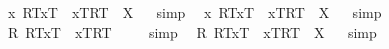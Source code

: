 \begin{isabellebody}
%
\endisatagproof
{\isafoldproof}%
%
\isadelimproof
%
\endisadelimproof
\isanewline
{}\isamarkupfalse%
\ {\isachardoublequoteopen}{\isacharbrackleft}{\isacharparenleft}\isactrlbold {\isasymforall}x{\isachardot}\ {\isasymlparr}R\isactrlsup T{\isacharcomma}x\isactrlsup T{\isasymrparr}\ \isactrlbold {\isasymrightarrow}\ {\isasymlbrace}x\isactrlsup T{\isacharcomma}R\isactrlsup T{\isasymrbrace}{\isacharparenright}{\isacharbrackright}\ {\isacharequal}\ X{\isachardoublequoteclose}%
\isadelimproof
\ %
\endisadelimproof
%
\isatagproof
{}\isamarkupfalse%
\ simp\ \isamarkupfalse%
%
\endisatagproof
{\isafoldproof}%
%
\isadelimproof
%
\endisadelimproof
\isanewline
{}\isamarkupfalse%
\ {\isachardoublequoteopen}{\isacharparenleft}\isactrlbold {\isasymforall}x{\isachardot}\ {\isasymlparr}R\isactrlsup T{\isacharcomma}x\isactrlsup T{\isasymrparr}\ \isactrlbold {\isasymrightarrow}\ {\isasymlbrace}x\isactrlsup T{\isacharcomma}R\isactrlsup T{\isasymrbrace}{\isacharparenright}\ {\isacharequal}\ X{\isachardoublequoteclose}%
\isadelimproof
\ %
\endisadelimproof
%
\isatagproof
{}\isamarkupfalse%
\ simp\ \isamarkupfalse%
%
\endisatagproof
{\isafoldproof}%
%
\isadelimproof
%
\endisadelimproof
\isanewline
{}\isamarkupfalse%
\ {\isachardoublequoteopen}{\isacharbrackleft}{\isacharparenleft}\isactrlbold {\isasymforall}R{\isachardot}\ {\isasymlparr}R\isactrlsup T{\isacharcomma}x\isactrlsup T{\isasymrparr}\ \isactrlbold {\isasymrightarrow}\ {\isasymlbrace}x\isactrlsup T{\isacharcomma}R\isactrlsup T{\isasymrbrace}{\isacharparenright}{\isacharbrackright}\ {\isacharequal}\ {\isacharasterisk}{\isachardoublequoteclose}%
\isadelimproof
\ %
\endisadelimproof
%
\isatagproof
{}\isamarkupfalse%
\ simp\ \isamarkupfalse%
%
\endisatagproof
{\isafoldproof}%
%
\isadelimproof
%
\endisadelimproof
\isanewline
{}\isamarkupfalse%
\ {\isachardoublequoteopen}{\isacharparenleft}\isactrlbold {\isasymforall}R{\isachardot}\ {\isasymlparr}R\isactrlsup T{\isacharcomma}x\isactrlsup T{\isasymrparr}\ \isactrlbold {\isasymrightarrow}\ {\isasymlbrace}x\isactrlsup T{\isacharcomma}R\isactrlsup T{\isasymrbrace}{\isacharparenright}\ {\isacharequal}\ X{\isachardoublequoteclose}%
\isadelimproof
\ %
\endisadelimproof
%
\isatagproof
{}\isamarkupfalse%
\ simp\ \isamarkupfalse%
%
\endisatagproof
{\isafoldproof}%
%
\isadelimproof
%
\endisadelimproof
%
\isamarkuptrue%
\isamarkupfalse%

\end{isabellebody}
